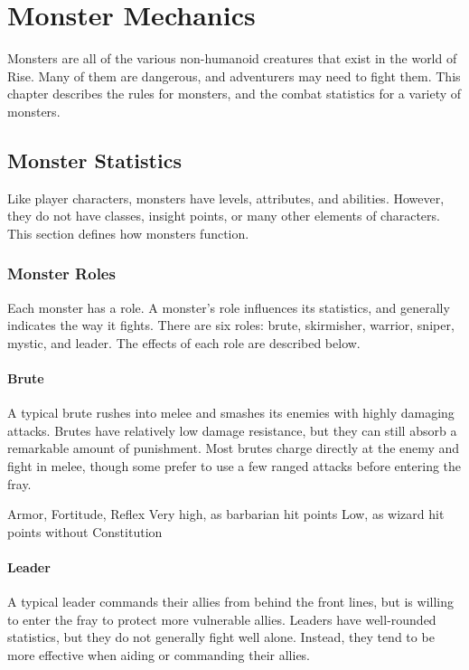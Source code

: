 \chapter{Monster Mechanics}

Monsters are all of the various non-humanoid creatures that exist in the world of Rise.
Many of them are dangerous, and adventurers may need to fight them.
This chapter describes the rules for monsters, and the combat statistics for a variety of monsters.

\section{Monster Statistics}
  Like player characters, monsters have levels, attributes, and abilities.
  However, they do not have classes, insight points, or many other elements of characters.
  This section defines how monsters function.

  \subsection{Monster Roles}
    Each monster has a role.
    A monster's role influences its statistics, and generally indicates the way it fights.
    There are six roles: brute, skirmisher, warrior, sniper, mystic, and leader.
    The effects of each role are described below.

    \subsubsection{Brute}
      A typical brute rushes into melee and smashes its enemies with highly damaging attacks.
      Brutes have relatively low damage resistance, but they can still absorb a remarkable amount of punishment.
      Most brutes charge directly at the enemy and fight in melee, though some prefer to use a few ranged attacks before entering the fray.

        Armor,  Fortitude,  Reflex
       Very high, as barbarian hit points
       Low, as wizard hit points without Constitution

    \subsubsection{Leader}
      A typical leader commands their allies from behind the front lines, but is willing to enter the fray to protect more vulnerable allies.
      Leaders have well-rounded statistics, but they do not generally fight well alone.
      Instead, they tend to be more effective when aiding or commanding their allies.

